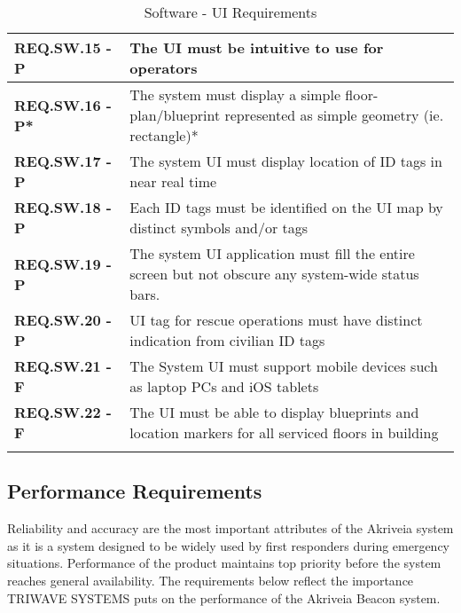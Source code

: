\bgroup
\def\arraystretch{1.5}
\begin{longtable}[H]{ | m{3.5cm} | m{12.5cm} |}
\hline
 \textbf{REQ.SW.15 - P} & The \Gls{UI} must be intuitive to use for operators \\
\hline
 \textbf{REQ.SW.16 - P*} & The system must display a simple floor-plan/blueprint represented as simple geometry (ie. rectangle)* \\
\hline
 \textbf{REQ.SW.17 - P} & The system UI must display location of ID tags in near real time \\
\hline
 \textbf{REQ.SW.18 - P} & Each ID tags must be identified on the UI map by distinct symbols and/or tags \\
\hline
 \textbf{REQ.SW.19 - P} & The system UI application must fill the entire screen but not obscure any system-wide status bars. \\
\hline
 \textbf{REQ.SW.20 - P} & UI tag for rescue operations must have distinct indication from civilian ID tags \\
\hline
 \textbf{REQ.SW.21 - F} & The System UI must support mobile devices such as laptop PCs and \Gls{iOS} tablets \\
\hline
 \textbf{REQ.SW.22 - F} & The UI must be able to display blueprints and location markers for all serviced floors in building \\
\hline
\caption{Software - UI Requirements}
\end{longtable}
\break

\subsection{Performance Requirements}
Reliability and accuracy are the most important attributes of the Akriveia system as it is a system designed to be widely used by first responders during emergency situations. Performance of the product maintains top priority before the system reaches general availability. The requirements below reflect the importance TRIWAVE SYSTEMS puts on the performance of the Akriveia Beacon system.

